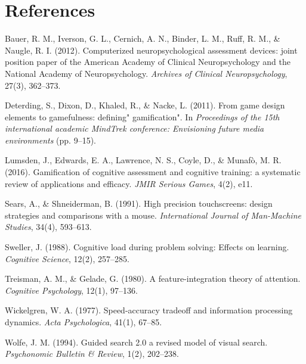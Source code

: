 \documentclass[11pt,a4paper]{article}
\begin{document}
\section*{References}
\begin{enumerate}[label={[\arabic*]}, leftmargin=*]
    \item Bauer, R. M., Iverson, G. L., Cernich, A. N., Binder, L. M., Ruff, R. M., \& Naugle, R. I. (2012). Computerized neuropsychological assessment devices: joint position paper of the American Academy of Clinical Neuropsychology and the National Academy of Neuropsychology. \textit{Archives of Clinical Neuropsychology}, 27(3), 362--373.
    \item Deterding, S., Dixon, D., Khaled, R., \& Nacke, L. (2011). From game design elements to gamefulness: defining" gamification". In \textit{Proceedings of the 15th international academic MindTrek conference: Envisioning future media environments} (pp. 9--15).
    \item Lumsden, J., Edwards, E. A., Lawrence, N. S., Coyle, D., \& Munafò, M. R. (2016). Gamification of cognitive assessment and cognitive training: a systematic review of applications and efficacy. \textit{JMIR Serious Games}, 4(2), e11.
    \item Sears, A., \& Shneiderman, B. (1991). High precision touchscreens: design strategies and comparisons with a mouse. \textit{International Journal of Man-Machine Studies}, 34(4), 593--613.
    \item Sweller, J. (1988). Cognitive load during problem solving: Effects on learning. \textit{Cognitive Science}, 12(2), 257--285.
    \item Treisman, A. M., \& Gelade, G. (1980). A feature-integration theory of attention. \textit{Cognitive Psychology}, 12(1), 97--136.
    \item Wickelgren, W. A. (1977). Speed-accuracy tradeoff and information processing dynamics. \textit{Acta Psychologica}, 41(1), 67--85.
    \item Wolfe, J. M. (1994). Guided search 2.0 a revised model of visual search. \textit{Psychonomic Bulletin \& Review}, 1(2), 202--238.
\end{enumerate}
\end{document}
